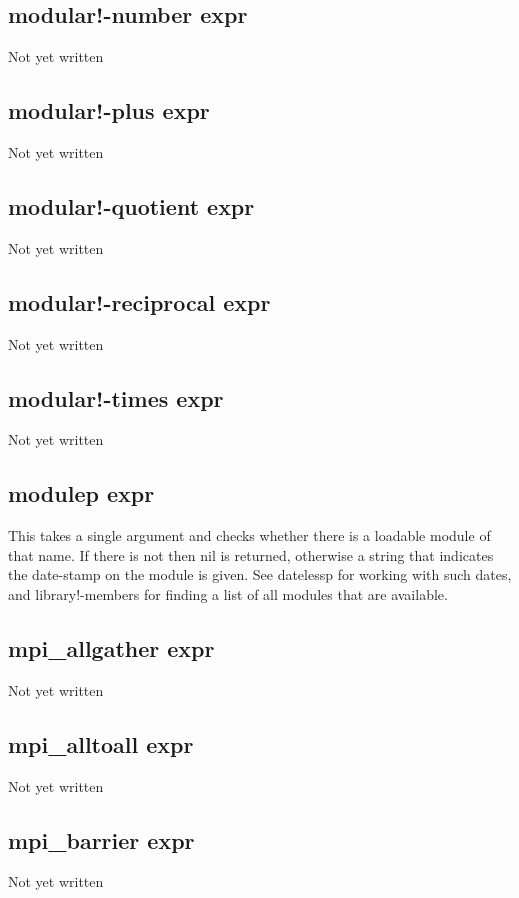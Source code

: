 \documentclass[a4paper,11pt]{article}
\begin{document}
{\subsection{\ttfamily modular!-number expr}
   Not yet written

\subsection{\ttfamily modular!-plus expr}
   Not yet written

\subsection{\ttfamily modular!-quotient expr}
   Not yet written

\subsection{\ttfamily modular!-reciprocal expr}
   Not yet written

\subsection{\ttfamily modular!-times expr}
   Not yet written

\subsection{\ttfamily modulep expr}
   This takes a single argument and checks whether there is a loadable module
   of that name. If there is not then {\ttfamily nil} is returned, otherwise a
   string that indicates the date-stamp on the module is given. See
   {\ttfamily datelessp} for working with such dates, and {\ttfamily
   library!-members} for finding a list of all modules that are available.
  

\subsection{\ttfamily mpi\_allgather expr}
   Not yet written

\subsection{\ttfamily mpi\_alltoall expr}
   Not yet written

\subsection{\ttfamily mpi\_barrier expr}
   Not yet written

}
\end{document}
